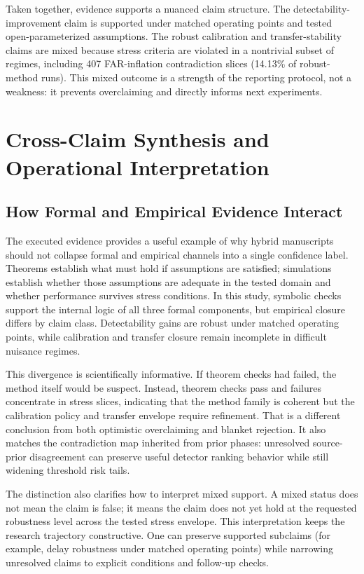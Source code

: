 \documentclass{article} %
\begin{document}
Taken together, evidence supports a nuanced claim structure. The detectability-improvement claim is supported under matched operating points and tested open-parameterized assumptions. The robust calibration and transfer-stability claims are mixed because stress criteria are violated in a nontrivial subset of regimes, including 407 FAR-inflation contradiction slices (14.13\% of robust-method runs). This mixed outcome is a strength of the reporting protocol, not a weakness: it prevents overclaiming and directly informs next experiments.

\section{Cross-Claim Synthesis and Operational Interpretation}\label{sec:synthesis}
\subsection{How Formal and Empirical Evidence Interact}
The executed evidence provides a useful example of why hybrid manuscripts should not collapse formal and empirical channels into a single confidence label. Theorems establish what must hold if assumptions are satisfied; simulations establish whether those assumptions are adequate in the tested domain and whether performance survives stress conditions. In this study, symbolic checks support the internal logic of all three formal components, but empirical closure differs by claim class. Detectability gains are robust under matched operating points, while calibration and transfer closure remain incomplete in difficult nuisance regimes.

This divergence is scientifically informative. If theorem checks had failed, the method itself would be suspect. Instead, theorem checks pass and failures concentrate in stress slices, indicating that the method family is coherent but the calibration policy and transfer envelope require refinement. That is a different conclusion from both optimistic overclaiming and blanket rejection. It also matches the contradiction map inherited from prior phases: unresolved source-prior disagreement can preserve useful detector ranking behavior while still widening threshold risk tails.

The distinction also clarifies how to interpret mixed support. A mixed status does not mean the claim is false; it means the claim does not yet hold at the requested robustness level across the tested stress envelope. This interpretation keeps the research trajectory constructive. One can preserve supported subclaims (for example, delay robustness under matched operating points) while narrowing unresolved claims to explicit conditions and follow-up checks.
\end{document}
